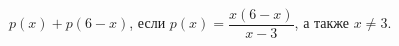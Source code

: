 \begin{ex}[type=calculate_expression]
	\begin{condition}
		\( p(x)+p(6-x) \), если \( p(x)=\dfrac{x(6-x)}{x-3} \), а также \( x\neq3 \).
	\end{condition}
\end{ex}